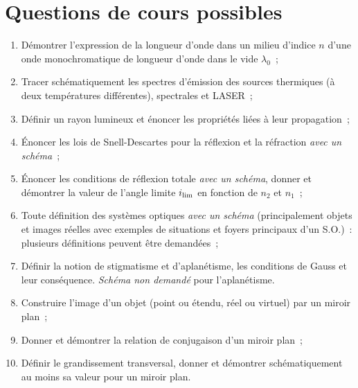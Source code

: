 \documentclass[a4paper, 12pt, final, garamond]{book}
\begin{document}
\section{Questions de cours possibles}
\begin{enumerate}
    \item Démontrer l'expression de la longueur d'onde dans un milieu d'indice
        $n$ d'une onde monochromatique de longueur d'onde dans le vide
        $\lambda_0$~;
    \item Tracer schématiquement les spectres d'émission des sources thermiques
        (à deux températures différentes), spectrales et LASER~;
    \item Définir un rayon lumineux et énoncer les propriétés liées à leur
        propagation~;
    \item Énoncer les lois de Snell-Descartes pour la réflexion et la réfraction
        \textit{avec un schéma}~;
    \item Énoncer les conditions de réflexion totale \textit{avec un schéma},
        donner et démontrer la valeur de l'angle limite $i_{\rm lim}$ en
        fonction de $n_2$ et $n_1$~;
    \item Toute définition des systèmes optiques \textit{avec un schéma}
        (principalement objets et images réelles avec exemples de situations et
        foyers principaux d'un S.O.)~: plusieurs définitions peuvent être
        demandées~;
    \item Définir la notion de stigmatisme et d'aplanétisme, les conditions de
        Gauss et leur conséquence. \textit{Schéma non demandé} pour
        l'aplanétisme.
    \item Construire l'image d'un objet (point ou étendu, réel ou virtuel) par
        un miroir plan~;
    \item Donner et démontrer la relation de conjugaison d'un miroir plan~;
    \item Définir le grandissement transversal, donner et démontrer
        schématiquement au moins sa valeur pour un miroir plan.
\end{enumerate}
\end{document}
